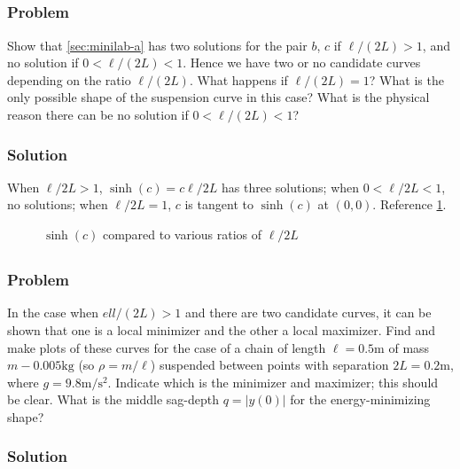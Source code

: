 \documentclass[12pt,twoside]{article}
\begin{document}
\subsection{}
\subsubsection*{Problem}
Show that \cref{sec:minilab-a} has two solutions for the pair $b$, $c$ if
$\ell/(2L)>1$, and no solution if $0<\ell/(2L)<1$. Hence we have two or no
candidate curves depending on the ratio $\ell/(2L)$. What happens if
$\ell/(2L)=1$? What is the only possible shape of the suspension curve in this
case? What is the physical reason there can be no solution if $0<\ell/(2L)<1$?

\subsubsection*{Solution}
When $\ell/2L>1$, $\sinh(c)=c\ell/2L$ has three solutions; when $0<\ell/2L<1$,
no solutions; when $\ell/2L=1$, $c$ is tangent to $\sinh(c)$ at $(0,0)$.
Reference \cref{fig:minilab-c}.

\begin{figure}[htp]
  \centering
  \caption{$\sinh(c)$ compared to various ratios of $\ell/2L$}
  \label{fig:minilab-c}
\end{figure}


\subsection{}
\subsubsection*{Problem}
In the case when $ell/(2L)>1$ and there are two candidate curves, it can be
shown that one is a local minimizer and the other a local maximizer. Find and
make plots of these curves for the case of a chain of length $\ell=0.5\text{m}$
of mass $m-0.005\text{kg}$ (so $\rho=m/\ell$) suspended between points with
separation $2L=0.2\text{m}$, where $g=9.8\text{m/s$^2$}$. Indicate which is the
minimizer and maximizer; this should be clear. What is the middle sag-depth
$q=|y(0)|$ for the energy-minimizing shape?

\subsubsection*{Solution}
\todo{}
\end{document}
